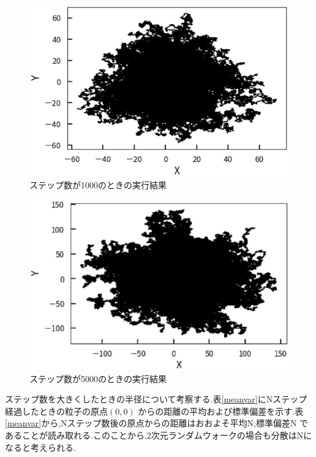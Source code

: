 \documentclass[a4j]{jarticle}
\begin{document}
            \begin{figure}[H]
                \centering
                \includegraphics[scale=0.6]{r2-1000.eps}
                \caption{ステップ数が1000のときの実行結果}
                \label{r1000}
                \end{figure}   
        
            \begin{figure}[H]
            \centering
            \includegraphics[scale=0.6]{r2-5000.eps}
            \caption{ステップ数が5000のときの実行結果}
            \label{r5000}
            \end{figure}   
            
            ステップ数を大きくしたときの半径について考察する.表\ref{meanvar}にNステップ経過したときの粒子の原点$(0,0)$
            からの距離の平均および標準偏差を示す.表\ref{meanvar}から,Nステップ数後の原点からの距離はおおよそ平均N,標準偏差N
            であることが読み取れる.このことから,2次元ランダムウォークの場合も分散はNになると考えられる.
            
\end{document}
